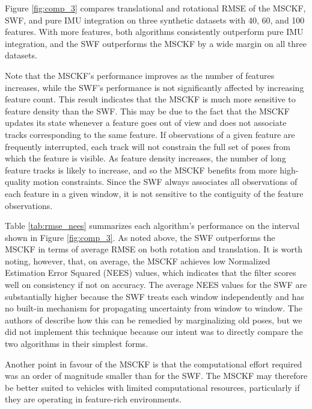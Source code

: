 \documentclass[letterpaper, 10 pt, conference]{ieeeconf}  %
\begin{document}
Figure \ref{fig:comp_3} compares translational and rotational RMSE of the MSCKF, SWF, and pure IMU integration on three synthetic datasets with 40, 60, and 100 features.
With more features, both algorithms consistently outperform pure IMU integration, and the SWF outperforms the MSCKF by a wide margin on all three datasets.

Note that the MSCKF's performance improves as the number of features increases, while the SWF's performance is not significantly affected by increasing feature count.
This result indicates that the MSCKF is much more sensitive to feature density than the SWF.
This may be due to the fact that the MSCKF updates its state whenever a feature goes out of view and does not associate tracks corresponding to the same feature.
If observations of a given feature are frequently interrupted, each track will not constrain the full set of poses from which the feature is visible.
As feature density increases, the number of long feature tracks is likely to increase, and so the MSCKF benefits from more high-quality motion constraints.
Since the SWF always associates all observations of each feature in a given window, it is not sensitive to the contiguity of the feature observations.

Table \ref{tab:rmse_nees} summarizes each algorithm's performance on the interval shown in Figure \ref{fig:comp_3}.
As noted above, the SWF outperforms the MSCKF in terms of average RMSE on both rotation and translation.
It is worth noting, however, that, on average, the MSCKF achieves low Normalized Estimation Error Squared (NEES) values, which indicates that the filter scores well on consistency if not on accuracy.
The average NEES values for the SWF are substantially higher because the SWF treats each window independently and has no built-in mechanism for propagating uncertainty from window to window.
The authors of \cite{Sibley:2010:JFR} describe how this can be remedied by marginalizing old poses, but we did not implement this technique because our intent was to directly compare the two algorithms in their simplest forms.

Another point in favour of the MSCKF is that the computational effort required was an order of magnitude smaller than for the SWF.
The MSCKF may therefore be better suited to vehicles with limited computational resources, particularly if they are operating in feature-rich environments.
\end{document}
